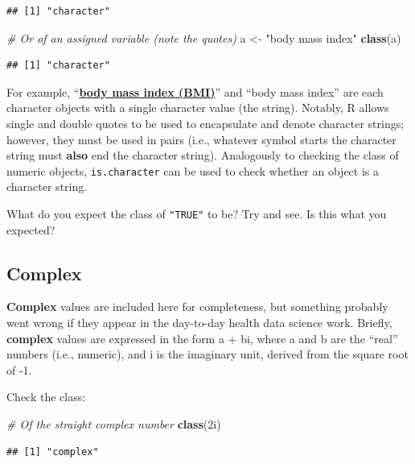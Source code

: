 \documentclass[
]{book}
\newenvironment{Shaded}{\begin{snugshade}}{\end{snugshade}}
\newcommand{\CommentTok}[1]{\textcolor[rgb]{0.56,0.35,0.01}{\textit{#1}}}
\newcommand{\DataTypeTok}[1]{\textcolor[rgb]{0.13,0.29,0.53}{#1}}
\newcommand{\DecValTok}[1]{\textcolor[rgb]{0.00,0.00,0.81}{#1}}
\newcommand{\FunctionTok}[1]{\textcolor[rgb]{0.13,0.29,0.53}{\textbf{#1}}}
\newcommand{\NormalTok}[1]{#1}
\newcommand{\OtherTok}[1]{\textcolor[rgb]{0.56,0.35,0.01}{#1}}
\newcommand{\StringTok}[1]{\textcolor[rgb]{0.31,0.60,0.02}{#1}}
\begin{document}
\begin{verbatim}
## [1] "character"
\end{verbatim}

\begin{Shaded}
\begin{Highlighting}[]
\CommentTok{\# Or of an assigned variable (note the quotes)}
\NormalTok{a }\OtherTok{\textless{}{-}} \StringTok{"body mass index"}
\FunctionTok{class}\NormalTok{(a)}
\end{Highlighting}
\end{Shaded}

\begin{verbatim}
## [1] "character"
\end{verbatim}

For example, ``\textbf{\hyperref[acronyms_BMI]{body mass index (BMI)}}'' and ``body mass index'' are each character objects with a single character value (the string). Notably, R allows single and double quotes to be used to encapsulate and denote character strings; however, they must be used in pairs (i.e., whatever symbol starts the character string must \textbf{also} end the character string). Analogously to checking the class of numeric objects, \texttt{is.character} can be used to check whether an object is a character string.

What do you expect the class of \texttt{"TRUE"} to be? Try and see. Is this what you expected?

\subsection{Complex}\label{sec:complex}

\textbf{Complex} values are included here for completeness, but something probably went wrong if they appear in the day-to-day health data science work. Briefly, \textbf{complex} values are expressed in the form a + bi, where a and b are the ``real'' numbers (i.e., numeric), and i is the imaginary unit, derived from the square root of -1.

Check the class:

\begin{Shaded}
\begin{Highlighting}[]
\CommentTok{\# Of the straight complex number}
\FunctionTok{class}\NormalTok{(}\DecValTok{2}\DataTypeTok{i}\NormalTok{)}
\end{Highlighting}
\end{Shaded}

\begin{verbatim}
## [1] "complex"
\end{verbatim}
\end{document}

